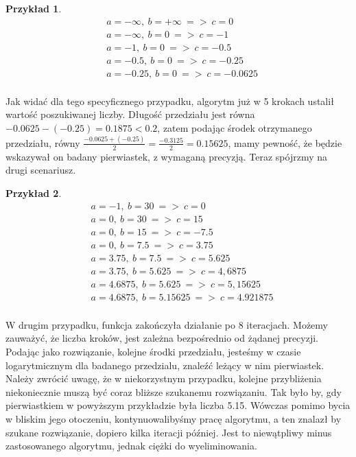 \documentclass[twoside,a4paper]{book}
\newtheorem{example}{Przykład}
\begin{document}
\begin{example}
	\begin{equation}
		\begin{split}
			&a = -\infty,\ b = +\infty\ =>\ c=0 \\
			&a = -\infty,\ b = 0\ =>\ c=-1 \\
			&a = -1,\ b = 0\ =>\ c=-0.5 \\
			&a = -0.5,\ b = 0\ =>\ c=-0.25 \\
			&a = -0.25,\ b = 0\ =>\ c=-0.0625 \\
		\end{split}
	\end{equation}
\end{example}

Jak widać dla tego specyficznego przypadku, algorytm już w 5 krokach ustalił wartość poszukiwanej liczby. Długość przedziału jest równa $-0.0625-(-0.25)=0.1875<0.2$, zatem podając środek otrzymanego przedziału, równy $\frac{-0.0625+(-0.25)}{2}=\frac{-0.3125}{2}=0.15625$, mamy pewność, że będzie wskazywał on badany pierwiastek, z wymaganą precyzją. Teraz spójrzmy na drugi scenariusz.

\begin{example}
	\begin{equation}
	\begin{split}
	&a = -1,\ b = 30\ =>\ c=0 \\
	&a = 0,\ b = 30\ =>\ c=15 \\
	&a = 0,\ b = 15\ =>\ c=-7.5 \\
	&a = 0,\ b = 7.5\ =>\ c=3.75 \\
	&a = 3.75,\ b = 7.5\ =>\ c=5.625 \\
	&a = 3.75,\ b = 5.625\ =>\ c=4,6875 \\
	&a = 4.6875,\ b = 5.625\ =>\ c=5,15625 \\
	&a = 4.6875,\ b = 5.15625\ =>\ c=4.921875 \\
	\end{split}
	\end{equation}
\end{example}

W drugim przypadku, funkcja zakończyła działanie po 8 iteracjach. Możemy zauważyć, że liczba kroków, jest zależna bezpośrednio od żądanej precyzji. Podając jako rozwiązanie, kolejne środki przedziału, jesteśmy w czasie logarytmicznym dla badanego przedzialu, znaleźć leżący w nim pierwiastek. Należy zwrócić uwagę, że w niekorzystnym przypadku, kolejne przybliżenia niekoniecznie muszą być coraz bliższe szukanemu rozwiązaniu. Tak było by, gdy pierwiastkiem w powyższym przykładzie była liczba 5.15. Wówczas pomimo bycia w bliskim jego otoczeniu, kontynuowalibyśmy pracę algorytmu, a ten znalazł by szukane rozwiązanie, dopiero kilka iteracji później. Jest to niewątpliwy minus zastosowanego algorytmu, jednak ciężki do wyeliminowania.
\\
\end{document}
